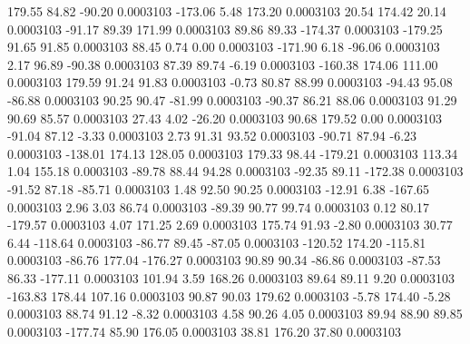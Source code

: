       179.55       84.82      -90.20     0.0003103
     -173.06        5.48      173.20     0.0003103
       20.54      174.42       20.14     0.0003103
      -91.17       89.39      171.99     0.0003103
       89.86       89.33     -174.37     0.0003103
     -179.25       91.65       91.85     0.0003103
       88.45        0.74        0.00     0.0003103
     -171.90        6.18      -96.06     0.0003103
        2.17       96.89      -90.38     0.0003103
       87.39       89.74       -6.19     0.0003103
     -160.38      174.06      111.00     0.0003103
      179.59       91.24       91.83     0.0003103
       -0.73       80.87       88.99     0.0003103
      -94.43       95.08      -86.88     0.0003103
       90.25       90.47      -81.99     0.0003103
      -90.37       86.21       88.06     0.0003103
       91.29       90.69       85.57     0.0003103
       27.43        4.02      -26.20     0.0003103
       90.68      179.52        0.00     0.0003103
      -91.04       87.12       -3.33     0.0003103
        2.73       91.31       93.52     0.0003103
      -90.71       87.94       -6.23     0.0003103
     -138.01      174.13      128.05     0.0003103
      179.33       98.44     -179.21     0.0003103
      113.34        1.04      155.18     0.0003103
      -89.78       88.44       94.28     0.0003103
      -92.35       89.11     -172.38     0.0003103
      -91.52       87.18      -85.71     0.0003103
        1.48       92.50       90.25     0.0003103
      -12.91        6.38     -167.65     0.0003103
        2.96        3.03       86.74     0.0003103
      -89.39       90.77       99.74     0.0003103
        0.12       80.17     -179.57     0.0003103
        4.07      171.25        2.69     0.0003103
      175.74       91.93       -2.80     0.0003103
       30.77        6.44     -118.64     0.0003103
      -86.77       89.45      -87.05     0.0003103
     -120.52      174.20     -115.81     0.0003103
      -86.76      177.04     -176.27     0.0003103
       90.89       90.34      -86.86     0.0003103
      -87.53       86.33     -177.11     0.0003103
      101.94        3.59      168.26     0.0003103
       89.64       89.11        9.20     0.0003103
     -163.83      178.44      107.16     0.0003103
       90.87       90.03      179.62     0.0003103
       -5.78      174.40       -5.28     0.0003103
       88.74       91.12       -8.32     0.0003103
        4.58       90.26        4.05     0.0003103
       89.94       88.90       89.85     0.0003103
     -177.74       85.90      176.05     0.0003103
       38.81      176.20       37.80     0.0003103
